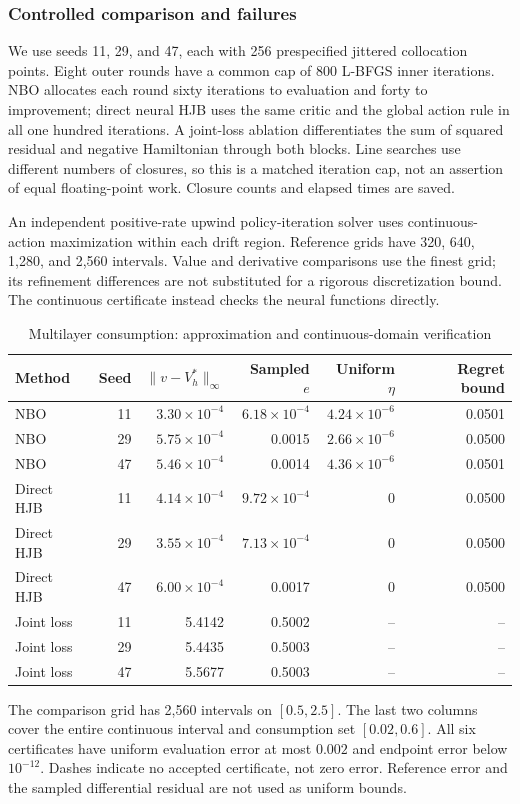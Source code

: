 \subsubsection{Controlled comparison and failures}
We use seeds 11, 29, and 47, each with 256 prespecified jittered collocation points. Eight outer rounds have a common cap of 800 L-BFGS inner iterations. NBO allocates each round sixty iterations to evaluation and forty to improvement; direct neural HJB uses the same critic and the global action rule in all one hundred iterations. A joint-loss ablation differentiates the sum of squared residual and negative Hamiltonian through both blocks. Line searches use different numbers of closures, so this is a matched iteration cap, not an assertion of equal floating-point work. Closure counts and elapsed times are saved.

An independent positive-rate upwind policy-iteration solver uses continuous-action maximization within each drift region. Reference grids have 320, 640, 1,280, and 2,560 intervals. Value and derivative comparisons use the finest grid; its refinement differences are not substituted for a rigorous discretization bound. The continuous certificate instead checks the neural functions directly.

\begin{table}[t]\centering
\caption{Multilayer consumption: approximation and continuous-domain verification}\label{tab:consumption-r6}
\small\begin{tabular}{lrrrrr}
\toprule
Method & Seed & $\|v-V_h^*\|_\infty$ & Sampled $e$ & Uniform $\eta$ & Regret bound\\\midrule
NBO & 11 & $3.30\times10^{-4}$ & $6.18\times10^{-4}$ & $4.24\times10^{-6}$ & 0.0501\\
NBO & 29 & $5.75\times10^{-4}$ & 0.0015 & $2.66\times10^{-6}$ & 0.0500\\
NBO & 47 & $5.46\times10^{-4}$ & 0.0014 & $4.36\times10^{-6}$ & 0.0501\\
Direct HJB & 11 & $4.14\times10^{-4}$ & $9.72\times10^{-4}$ & 0 & 0.0500\\
Direct HJB & 29 & $3.55\times10^{-4}$ & $7.13\times10^{-4}$ & 0 & 0.0500\\
Direct HJB & 47 & $6.00\times10^{-4}$ & 0.0017 & 0 & 0.0500\\
Joint loss & 11 & 5.4142 & 0.5002 & -- & --\\
Joint loss & 29 & 5.4435 & 0.5003 & -- & --\\
Joint loss & 47 & 5.5677 & 0.5003 & -- & --\\
\bottomrule\end{tabular}
\par\smallskip\footnotesize The comparison grid has 2,560 intervals on $[0.5,2.5]$. The last two columns cover the entire continuous interval and consumption set $[0.02,0.6]$. All six certificates have uniform evaluation error at most $0.002$ and endpoint error below $10^{-12}$. Dashes indicate no accepted certificate, not zero error. Reference error and the sampled differential residual are not used as uniform bounds.
\end{table}


